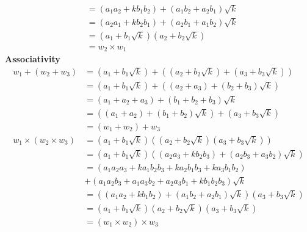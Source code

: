 \documentclass[addpoints]{exam}
\theoremstyle{mytheoremstyle}
\theoremstyle{mytheoremstyle}
\theoremstyle{myproblemstyle}
\begin{document}
\begin{questions}
\begin{parts}
\begin{solution}
\begin{align*}
                                  & = (a_{1}a_{2}+kb_{1}b_{2})+(a_{1}b_{2}+a_{2}b_{1})\sqrt{k} \\
                                  & = (a_{2}a_{1}+kb_{2}b_{1})+(a_{2}b_{1}+a_{1}b_{2})\sqrt{k} \\
                                  & = (a_{1}+b_{1}\sqrt{k})(a_{2}+b_{2}\sqrt{k})               \\
                                  & = w_{2}\times w_{1}
            \end{align*}
            \textbf{Associativity}
            \begin{align*}
                w_{1}+(w_{2}+w_{3})             & = (a_{1}+b_{1}\sqrt{k})+((a_{2}+b_{2}\sqrt{k})+(a_{3}+b_{3}\sqrt{k}))             \\
                                                & = (a_{1}+b_{1}\sqrt{k})+((a_{2}+a_{3})+(b_{2}+b_{3})\sqrt{k})                     \\
                                                & = (a_{1}+a_{2}+a_{3})+(b_{1}+b_{2}+b_{3})\sqrt{k}                                 \\
                                                & = ((a_{1}+a_{2})+(b_{1}+b_{2})\sqrt{k})+(a_{3}+b_{3}\sqrt{k})                     \\
                                                & = (w_{1}+w_{2})+w_{3}                                                             \\
                w_{1}\times (w_{2}\times w_{3}) & = (a_{1}+b_{1}\sqrt{k})((a_{2}+b_{2}\sqrt{k})(a_{3}+b_{3}\sqrt{k}))               \\
                                                & = (a_{1}+b_{1}\sqrt{k})((a_{2}a_{3}+kb_{2}b_{3})+(a_{2}b_{3}+a_{3}b_{2})\sqrt{k}) \\
                                                & = (a_{1}a_{2}a_{3}+ka_{1}b_{2}b_{3}+ka_{2}b_{1}b_{3}+ka_{3}b_{1}b_{2})            \\
                                                & +(a_{1}a_{2}b_{3}+a_{1}a_{3}b_{2}+a_{2}a_{3}b_{1}+kb_{1}b_{2}b_{3})\sqrt{k}       \\
                                                & = ((a_{1}a_{2}+kb_{1}b_{2})+(a_{1}b_{2}+a_{2}b_{1})\sqrt{k})(a_{3}+b_{3}\sqrt{k}) \\
                                                & = (a_{1}+b_{1}\sqrt{k})(a_{2}+b_{2}\sqrt{k})(a_{3}+b_{3}\sqrt{k})                 \\
                                                & = (w_{1}\times w_{2})\times w_{3}

\end{align*}
\end{solution}
\end{parts}
\end{questions}
\end{document}

